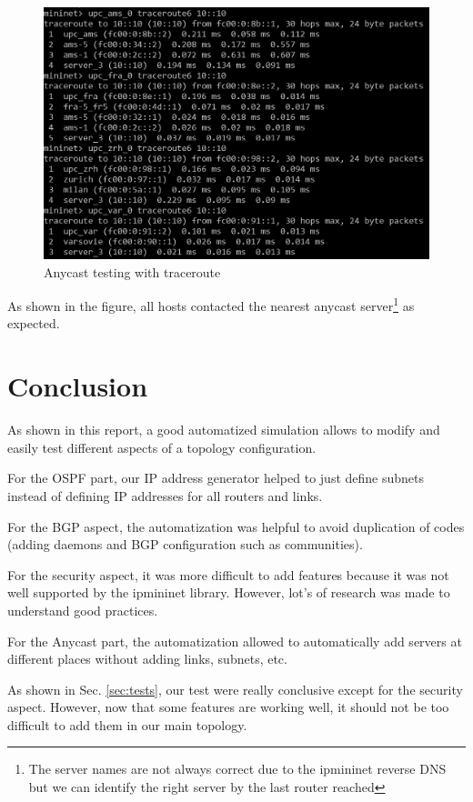 \documentclass[letter, 9pt, conference]{ieeeconf}
\begin{document}
\begin{figure}[h!]
    \includegraphics[width=\linewidth]{anycast_test.PNG}
    \caption{Anycast testing with traceroute}
    \label{fig:anycast_test}
\end{figure}

As shown in the figure, all hosts contacted the nearest anycast server\footnote{The server names are not always correct due to the ipmininet reverse DNS but we can identify the right server by the last router reached} as expected. 

\section{Conclusion}

As shown in this report, a good automatized simulation allows to modify and easily test different aspects of a topology configuration. 

For the OSPF part, our IP address generator helped to just define subnets instead of defining IP addresses for all routers and links. 

For the BGP aspect, the automatization was helpful to avoid duplication of codes (adding daemons and BGP configuration such as communities). 

For the security aspect, it was more difficult to add features because it was not well supported by the ipmininet library. However, lot's of research was made to understand good practices. 

For the Anycast part, the automatization allowed to automatically add servers at different places without adding links, subnets, etc. 

As shown in Sec. \ref{sec:tests}, our test were really conclusive except for the security aspect. However, now that some features are working well, it should not be too difficult to add them in our main topology. 
\end{document}
